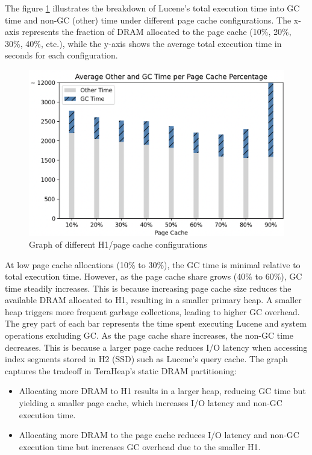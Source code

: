 The figure \ref{fig:graph} illustrates the breakdown of Lucene’s total execution
time into GC time and non-GC (other) time under different page cache
configurations. The x-axis represents the fraction of DRAM allocated to the page
cache (10\%, 20\%, 30\%, 40\%, etc.), while the y-axis shows the average total
execution time in seconds for each configuration.

\begin{figure}[htbp]
  \centering
  \includegraphics[width=1\columnwidth]{fig/numbers.png}
  \caption{Graph of different H1/page cache configurations}
  \label{fig:graph}
\end{figure}

At low page cache allocations (10\% to 30\%), the GC time is minimal relative to total execution time. However, as the page cache share grows (40\% to 60\%), GC time steadily increases. This is because increasing page cache size reduces the available DRAM allocated to H1, resulting in a smaller primary heap. A smaller heap triggers more frequent garbage collections, leading to higher GC overhead.
The grey part of each bar represents the time spent executing Lucene and system operations excluding GC. As the page cache share increases, the non-GC time decreases. This is because a larger page cache reduces I/O latency when accessing index segments stored in H2 (SSD) such as Lucene's query cache.
The graph captures the tradeoff in TeraHeap’s static DRAM partitioning: \vspace{-0.5em} 
\begin{itemize} 
  \item Allocating more DRAM to H1 results in a larger heap, reducing GC time but yielding a smaller page cache, which increases I/O latency and non-GC execution time.
  \item Allocating more DRAM to the page cache reduces I/O latency and non-GC execution time but increases GC overhead due to the smaller H1.
\end{itemize} 
\vspace{-0.5em}

